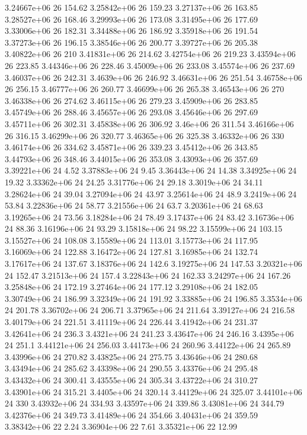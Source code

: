 3.24667e+06 26 154.62
3.25842e+06 26 159.23
3.27137e+06 26 163.85
3.28527e+06 26 168.46
3.29993e+06 26 173.08
3.31495e+06 26 177.69
3.33006e+06 26 182.31
3.34488e+06 26 186.92
3.35918e+06 26 191.54
3.37273e+06 26 196.15
3.38546e+06 26 200.77
3.39727e+06 26 205.38
3.40822e+06 26 210
3.41831e+06 26 214.62
3.42754e+06 26 219.23
3.43594e+06 26 223.85
3.44346e+06 26 228.46
3.45009e+06 26 233.08
3.45574e+06 26 237.69
3.46037e+06 26 242.31
3.4639e+06 26 246.92
3.46631e+06 26 251.54
3.46758e+06 26 256.15
3.46777e+06 26 260.77
3.46699e+06 26 265.38
3.46543e+06 26 270
3.46338e+06 26 274.62
3.46115e+06 26 279.23
3.45909e+06 26 283.85
3.45749e+06 26 288.46
3.45657e+06 26 293.08
3.45646e+06 26 297.69
3.45711e+06 26 302.31
3.45838e+06 26 306.92
3.46e+06 26 311.54
3.46166e+06 26 316.15
3.46299e+06 26 320.77
3.46365e+06 26 325.38
3.46332e+06 26 330
3.46174e+06 26 334.62
3.45871e+06 26 339.23
3.45412e+06 26 343.85
3.44793e+06 26 348.46
3.44015e+06 26 353.08
3.43093e+06 26 357.69
3.39221e+06 24 4.52
3.37883e+06 24 9.45
3.36443e+06 24 14.38
3.34925e+06 24 19.32
3.33362e+06 24 24.25
3.31776e+06 24 29.18
3.3019e+06 24 34.11
3.28624e+06 24 39.04
3.27094e+06 24 43.97
3.25614e+06 24 48.9
3.2419e+06 24 53.84
3.22836e+06 24 58.77
3.21556e+06 24 63.7
3.20361e+06 24 68.63
3.19265e+06 24 73.56
3.18284e+06 24 78.49
3.17437e+06 24 83.42
3.16736e+06 24 88.36
3.16196e+06 24 93.29
3.15818e+06 24 98.22
3.15599e+06 24 103.15
3.15527e+06 24 108.08
3.15589e+06 24 113.01
3.15773e+06 24 117.95
3.16069e+06 24 122.88
3.16472e+06 24 127.81
3.16985e+06 24 132.74
3.17617e+06 24 137.67
3.18376e+06 24 142.6
3.19275e+06 24 147.53
3.20321e+06 24 152.47
3.21513e+06 24 157.4
3.22843e+06 24 162.33
3.24297e+06 24 167.26
3.25848e+06 24 172.19
3.27464e+06 24 177.12
3.29108e+06 24 182.05
3.30749e+06 24 186.99
3.32349e+06 24 191.92
3.33885e+06 24 196.85
3.3534e+06 24 201.78
3.36702e+06 24 206.71
3.37965e+06 24 211.64
3.39127e+06 24 216.58
3.40179e+06 24 221.51
3.41119e+06 24 226.44
3.41942e+06 24 231.37
3.42641e+06 24 236.3
3.4321e+06 24 241.23
3.43647e+06 24 246.16
3.4395e+06 24 251.1
3.44121e+06 24 256.03
3.44173e+06 24 260.96
3.44122e+06 24 265.89
3.43996e+06 24 270.82
3.43825e+06 24 275.75
3.43646e+06 24 280.68
3.43494e+06 24 285.62
3.43398e+06 24 290.55
3.43376e+06 24 295.48
3.43432e+06 24 300.41
3.43555e+06 24 305.34
3.43722e+06 24 310.27
3.43901e+06 24 315.21
3.4405e+06 24 320.14
3.44129e+06 24 325.07
3.44101e+06 24 330
3.43932e+06 24 334.93
3.43597e+06 24 339.86
3.43081e+06 24 344.79
3.42376e+06 24 349.73
3.41489e+06 24 354.66
3.40431e+06 24 359.59
3.38342e+06 22 2.24
3.36904e+06 22 7.61
3.35321e+06 22 12.99
